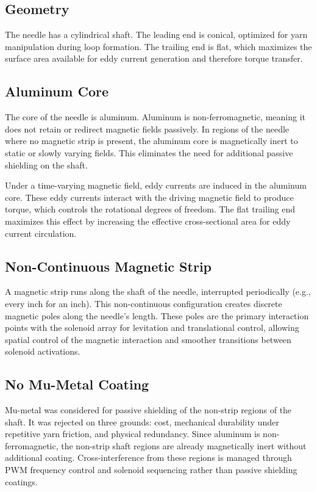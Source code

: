 \documentclass[10pt]{article}
\begin{document}
\subsection{Geometry}
The needle has a cylindrical shaft. The leading end is conical, optimized for yarn manipulation during loop formation. The trailing end is flat, which maximizes the surface area available for eddy current generation and therefore torque transfer.

\subsection{Aluminum Core}
The core of the needle is aluminum. Aluminum is non-ferromagnetic, meaning it does not retain or redirect magnetic fields passively. In regions of the needle where no magnetic strip is present, the aluminum core is magnetically inert to static or slowly varying fields. This eliminates the need for additional passive shielding on the shaft.

Under a time-varying magnetic field, eddy currents are induced in the aluminum core. These eddy currents interact with the driving magnetic field to produce torque, which controls the rotational degrees of freedom. The flat trailing end maximizes this effect by increasing the effective cross-sectional area for eddy current circulation.

\subsection{Non-Continuous Magnetic Strip}
A magnetic strip runs along the shaft of the needle, interrupted periodically (e.g., every inch for an inch). This non-continuous configuration creates discrete magnetic poles along the needle's length. These poles are the primary interaction points with the solenoid array for levitation and translational control, allowing spatial control of the magnetic interaction and smoother transitions between solenoid activations.

\subsection{No Mu-Metal Coating}
Mu-metal was considered for passive shielding of the non-strip regions of the shaft. It was rejected on three grounds: cost, mechanical durability under repetitive yarn friction, and physical redundancy. Since aluminum is non-ferromagnetic, the non-strip shaft regions are already magnetically inert without additional coating. Cross-interference from these regions is managed through PWM frequency control and solenoid sequencing rather than passive shielding coatings.
\end{document}
